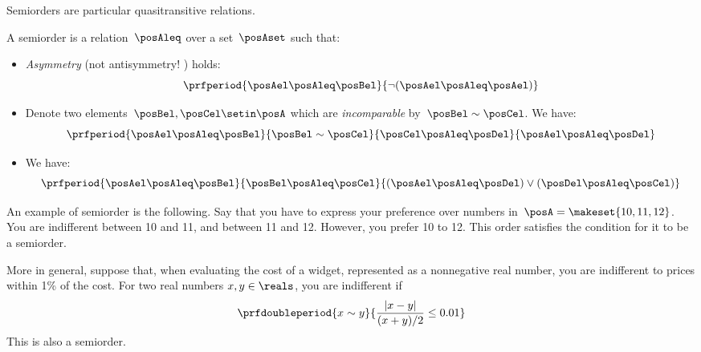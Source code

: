 Semiorders are particular quasitransitive relations.
\begin{definition}[Semiorder]

    A semiorder is a relation~$\posAleq$ over a set~$\posAset$ such that:
    \begin{itemize}
        \item \emph{Asymmetry} (not antisymmetry!
              ) holds:
              \begin{equation}
                  \prfperiod{\posAel \posAleq \posBel}{\neg(\posAel \posAleq \posAel)}
              \end{equation}
        \item Denote two elements~$\posBel, \posCel \setin \posA$ which are \emph{incomparable} by~$\posBel \sim \posCel$.
              We have:
              \begin{equation}
                  \prfperiod{\posAel \posAleq \posBel}{\posBel \sim \posCel}{\posCel \posAleq \posDel}{\posAel \posAleq \posDel}
              \end{equation}
        \item We have:
              \begin{equation}
                  \prfperiod{\posAel \posAleq \posBel}{\posBel \posAleq \posCel}{(\posAel \posAleq \posDel) \vee (\posDel \posAleq \posCel)}
              \end{equation}
    \end{itemize}

\end{definition}
\begin{example}
    An example of semiorder is the following.
    Say that you have to express your preference over numbers in~$\posA=\makeset{10,11,12}$.
    You are indifferent between 10 and 11, and between 11 and 12.
    However, you prefer 10 to 12.
    This order satisfies the condition for it to be a semiorder.

    More in general, suppose that, when evaluating the cost of a widget, represented as a nonnegative real number, you are indifferent to prices within 1\% of the cost.
    For two real numbers $x,y\in\reals$, you are indifferent if
    \begin{equation}
        \prfdoubleperiod{
            x \sim y
        }{
            \frac{| x - y |}{ (x+y)/2} \leq 0.01
        }
    \end{equation}
    This is also a semiorder.
\end{example}


